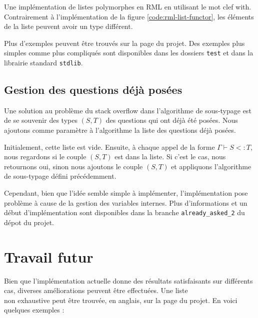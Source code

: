 \begin{listing}
  \inputminted{OCaml}{codes/list.rml}
  \caption{Une implémentation de listes polymorphes en RML en utilisant le mot
    clef with. Contrairement à l'implémentation de la figure
    \ref{code:rml-list-functor}, les éléments de la liste peuvent avoir un type
  différent.}
  \label{code:rml-list-with}
\end{listing}

Plus d'exemples peuvent être trouvés sur la page du projet. Des exemples plus
simples comme plus compliqués sont disponibles dans les dossiers \verb|test| et
dans la librairie standard \verb|stdlib|.

\subsection*{Gestion des questions déjà posées}

Une solution au problème du stack overflow dans l'algorithme de sous-typage est
de se souvenir des types $(S, T)$ des questions qui ont déjà été posées. Nous
ajoutons comme paramètre à l'algorithme la liste des questions déjà posées.

Initialement, cette liste est vide. Ensuite, à chaque appel de la forme $\Gamma
\vdash S <: T$, nous regardons si le couple $(S, T)$ est dans la liste. Si c'est
le cas, nous retournons oui, sinon nous ajoutons le couple $(S, T)$ et
appliquons l'algorithme de sous-typage défini précédemment.

Cependant, bien que l'idée semble simple à implémenter, l'implémentation pose
problème à cause de la gestion des variables internes.
Plus d'informations et un début d'implémentation sont disponibles dans la
branche \verb|already_asked_2| du dépot du projet.

\section{Travail futur}

Bien que l'implémentation actuelle donne des résultats satisfaisants sur
différents cas, diverses améliorations peuvent être effectuées. Une liste \\
non exhaustive peut être trouvée, en anglais, sur la page du
projet\cite{rml-github-issues}. En voici quelques exemples :

